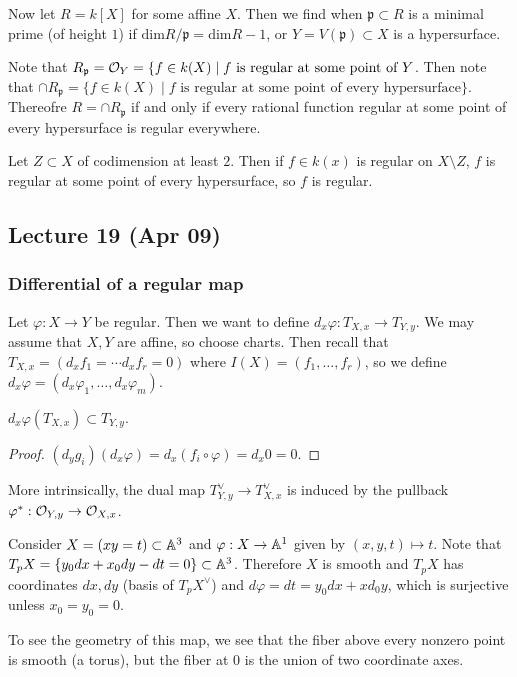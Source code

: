 \documentclass[twoside, 10pt]{article}
\begin{document}
    Now let $R=k[X]$ for some affine $X$. Then we find when $\mathfrak{p} \subset R$ is a minimal prime (of height $1$) if $\mathrm{dim} R/\mathfrak{p} = \mathrm{dim} R - 1$, or $Y = V(\mathfrak{p}) \subset X$ is a hypersurface.

    Note that $R_{\mathfrak{p}} = \mathcal{O}_Y = \{ f \in k(X) \mid f \text{ is regular at some point of } Y$.
        Then note that $\cap R_{\mathfrak{p}} = \{f \in k(X) \mid f \text{ is regular at some point of every hypersurface}\}$. Thereofre $R = \cap R_{\mathfrak{p}}$ if and only if every rational function regular at some point of every hypersurface is regular everywhere.

        \begin{thm}
            Let $Z \subset X$ of codimension at least $2$. Then if $f \in k(x)$ is regular on $X \setminus Z$, $f$ is regular at some point of every hypersurface, so $f$ is regular.
        \end{thm}

        \subsection{Lecture 19 (Apr 09)}
        \subsubsection{Differential of a regular map}
        Let $\varphi:X \to Y$ be regular. Then we want to define $d_x \varphi: T_{X,x} \to T_{Y,y}$. We may assume that $X,Y$ are affine, so choose charts. Then recall that $T_{X,x} = (d_xf_1 = \cdots d_xf_r = 0)$ where $I(X) = (f_1, \ldots, f_r)$, so we define $d_x \varphi = (d_x \varphi_1, \ldots, d_x\varphi_m)$. 

        \begin{prop}
            $d_x \varphi(T_{X,x}) \subset T_{Y,y}$. 
            \begin{proof}
                $(d_yg_i)(d_x \varphi) = d_x (f_i \circ \varphi) = d_x 0 = 0$.
            \end{proof}
        \end{prop}

        More intrinsically, the dual map $T_{Y,y}^{\vee} \to T_{X,x}^{\vee}$ is induced by the pullback $\varphi^*: \mathcal{O}_{Y,y} \to \mathcal{O}_{X,x}$.

        \begin{exm}
            Consider $X = (xy=t) \subset \mathbb{A}^3$ and $\varphi:X \to \mathbb{A}^1$ given by $(x,y,t) \mapsto t$. Note that $T_pX = \{y_0dx + x_0dy - dt = 0 \} \subset \mathbb{A}^3$. Therefore $X$ is smooth and $T_pX$ has coordinates $dx,dy$ (basis of $T_p X^{\vee}$) and $d\varphi = dt = y_0dx+xd_0y$, which is surjective unless $x_0=y_0=0$.

            To see the geometry of this map, we see that the fiber above every nonzero point is smooth (a torus), but the fiber at $0$ is the union of two coordinate axes.
        \end{exm}
\end{document}
